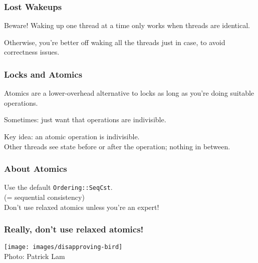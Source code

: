 \begin{frame}
\frametitle{Lost Wakeups}


Beware! Waking up one thread at a time only works when threads are identical.

Otherwise, you're better off waking all the threads just in case, to avoid correctness issues.

\end{frame}

\begin{frame}
\frametitle{Locks and Atomics}

 Atomics are a lower-overhead alternative to
locks as long as you're doing suitable operations. 

Sometimes: just want that operations are indivisible.

Key idea: an \alert{atomic operation} is indivisible.\\
\quad Other threads see state before or after the operation; nothing in between.

\end{frame}


\begin{frame}[fragile]
  \frametitle{About Atomics}

\vspace*{-2em}

\Large
    Use the default {\tt Ordering::SeqCst}.\\
    (= sequential consistency)\\[1em]

    \alert{Don't use relaxed atomics unless you're an expert!}\\[1em]
    
    
\end{frame}



\begin{frame}[fragile]
  \frametitle{Really, don't use relaxed atomics!}
  \begin{center}
    \texttt{[image: images/disapproving-bird]}\\
    Photo: Patrick Lam
  \end{center}
\end{frame}

